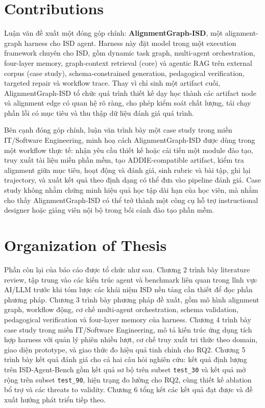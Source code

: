 \documentclass[../main.tex]{subfiles}
\begin{document}
\section{Contributions}

Luận văn đề xuất một đóng góp chính: \textbf{AlignmentGraph-ISD}, một alignment-graph harness cho \gls{ISD} agent. Harness này đặt model trong một execution framework chuyên cho ISD, gồm dynamic task graph, multi-agent orchestration, four-layer memory, graph-context retrieval (core) và agentic RAG trên external corpus (case study), schema-constrained generation, pedagogical verification, targeted repair và workflow trace. Thay vì chỉ sinh một artifact cuối, AlignmentGraph-ISD tổ chức quá trình thiết kế dạy học thành các artifact node và alignment edge có quan hệ rõ ràng, cho phép kiểm soát chất lượng, tái chạy phần lỗi có mục tiêu và thu thập dữ liệu đánh giá quá trình.

Bên cạnh đóng góp chính, luận văn trình bày một case study trong miền IT/Software Engineering, minh hoạ cách AlignmentGraph-ISD được dùng trong một workflow thực tế: nhận yêu cầu thiết kế hoặc cải tiến một module đào tạo, truy xuất tài liệu miền phần mềm, tạo ADDIE-compatible artifact, kiểm tra alignment giữa mục tiêu, hoạt động và đánh giá, sinh rubric và bài tập, ghi lại trajectory, và xuất kết quả theo định dạng có thể đưa vào pipeline đánh giá. Case study không nhằm chứng minh hiệu quả học tập dài hạn của học viên, mà nhằm cho thấy AlignmentGraph-ISD có thể trở thành một công cụ hỗ trợ instructional designer hoặc giảng viên nội bộ trong bối cảnh đào tạo phần mềm.

\section{Organization of Thesis}

Phần còn lại của báo cáo được tổ chức như sau. Chương 2 trình bày literature review, tập trung vào các kiến trúc agent và benchmark liên quan trong lĩnh vực AI/LLM trước khi tóm lược các khái niệm ISD nền tảng cần thiết để đọc phần phương pháp. Chương 3 trình bày phương pháp đề xuất, gồm mô hình alignment graph, workflow động, cơ chế multi-agent orchestration, schema validation, pedagogical verification và four-layer memory của harness. Chương 4 trình bày case study trong miền IT/Software Engineering, mô tả kiến trúc ứng dụng tích hợp harness với quản lý phiên nhiều lượt, cơ chế truy xuất tri thức theo domain, giao diện prototype, và giao thức đo hiệu quả tinh chỉnh cho RQ2. Chương 5 trình bày kết quả đánh giá cho cả hai câu hỏi nghiên cứu: kết quả định lượng trên ISD-Agent-Bench gồm kết quả sơ bộ trên subset \texttt{test\_30} và kết quả mở rộng trên subset \texttt{test\_90}, hiện trạng đo lường cho RQ2, cùng thiết kế ablation bổ trợ và các threats to validity. Chương 6 tổng kết các kết quả đạt được và đề xuất hướng phát triển tiếp theo.
\end{document}
